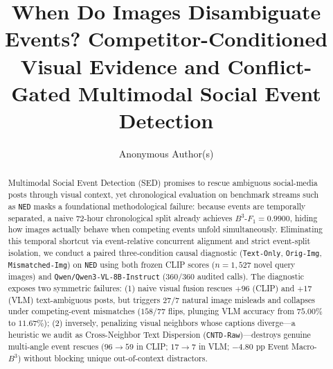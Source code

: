 \documentclass[sigconf,anonymous,review]{acmart}
\begin{document}
\title{When Do Images Disambiguate Events? Competitor-Conditioned Visual Evidence and Conflict-Gated Multimodal Social Event Detection}

\author{Anonymous Author(s)}

\begin{abstract}
Multimodal Social Event Detection (SED) promises to rescue ambiguous social-media posts through visual context, yet chronological evaluation on benchmark streams such as \texttt{NED} masks a foundational methodological failure: because events are temporally separated, a naive 72-hour chronological split already achieves $B^3\text{-}F_1 = 0.9900$, hiding how images actually behave when competing events unfold simultaneously. Eliminating this temporal shortcut via event-relative concurrent alignment and strict event-split isolation, we conduct a paired three-condition causal diagnostic (\texttt{Text-Only}, \texttt{Orig-Img}, \texttt{Mismatched-Img}) on \texttt{NED} using both frozen CLIP scores ($n=1{,}527$ novel query images) and \texttt{Qwen/Qwen3-VL-8B-Instruct} ($360/360$ audited calls). The diagnostic exposes two symmetric failures: (1) naive visual fusion rescues $+96$ (CLIP) and $+17$ (VLM) text-ambiguous posts, but triggers $27$/$7$ natural image misleads and collapses under competing-event mismatches ($158$/$77$ flips, plunging VLM accuracy from $75.00\%$ to $11.67\%$); (2) inversely, penalizing visual neighbors whose captions diverge---a heuristic we audit as Cross-Neighbor Text Dispersion (\texttt{CNTD-Raw})---destroys genuine multi-angle event rescues ($96 \to 59$ in CLIP; $17 \to 7$ in VLM; $-4.80\text{ pp}$ Event Macro-$B^3$) without blocking unique out-of-context distractors.


\end{abstract}
\end{document}
